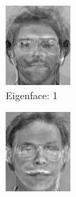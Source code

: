 \documentclass[12pt]{article}
\begin{document}
\begin{figure}
\begin{subfigure}[b]{0.20\textwidth}
		\includegraphics[width=\textwidth]{Task4.6_Images/PrincipalComponent1.jpg}
		\caption{Eigenface: 1}
	\end{subfigure}\quad
	\begin{subfigure}[b]{0.20\textwidth}
		\includegraphics[width=\textwidth]{Task4.6_Images/PrincipalComponent2.jpg}

\end{subfigure}
\end{figure}
\end{document}
